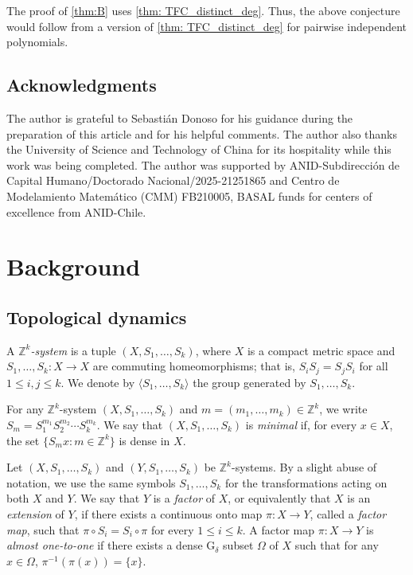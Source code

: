 \documentclass[11pt,reqno]{amsart}
\newcommand{\Z}{\mathbb{Z}}
\theoremstyle{definition}
\theoremstyle{remark}
\begin{document}
The proof of \cref{thm:B} uses \cref{thm: TFC_distinct_deg}. Thus, the above conjecture would follow from a version of \cref{thm: TFC_distinct_deg} for pairwise independent polynomials.

\subsection*{Acknowledgments}

The author is grateful to Sebastián Donoso for his guidance during the preparation of this article and for his helpful comments. The author also thanks the University of Science and Technology of China for its hospitality while this work was being completed. The author was supported by ANID-Subdirección de Capital Humano/Doctorado Nacional/2025-21251865 and Centro de Modelamiento Matemático (CMM) FB210005, BASAL funds for centers of excellence from ANID-Chile.

\section{Background}

\subsection{Topological dynamics}

A \emph{$\Z^k$-system} is a tuple $(X,S_1,\dots,S_k)$, where $X$ is a compact metric space and $S_1,\dots,S_k\colon X\to X$ are commuting homeomorphisms; that is, $S_iS_j=S_jS_i$ for all $1\leq i,j \leq k$. We denote by $\langle S_1,\dots,S_k\rangle$ the group generated by $S_1,\dots,S_k$.

For any $\Z^k$-system $(X,S_1,\dots,S_k)$ and $m = (m_1,\dots,m_k)\in\Z^k$, we write $S_m = S_1^{m_1}S_2^{m_2}\cdots S_k^{m_k}$. We say that $(X,S_1,\dots,S_k)$ is \emph{minimal} if, for every $x\in X$, the set $\{S_m x: m\in \Z^k\}$ is dense in $X$. 


Let $(X,S_1,\dots,S_k)$ and $(Y,S_1,\dots,S_k)$ be $\mathbb{Z}^k$-systems. By a slight abuse of notation, we use the same symbols $S_1,\dots,S_k$ for the transformations acting on both $X$ and $Y$. We say that $Y$ is a \emph{factor} of $X$, or equivalently that $X$ is an \emph{extension} of $Y$, if there exists a continuous onto map $\pi\colon X\to Y$, called a \emph{factor map}, such that $\pi\circ S_i=S_i\circ \pi$ for every $1\leq i\leq k$. A factor map $\pi:X\to Y$ is \emph{almost one-to-one} if there exists a dense G$_\delta$ subset $\Omega$ of $X$ such that for any $x\in \Omega$, $\pi^{-1}(\pi(x))=\{x\}$.
\end{document}
